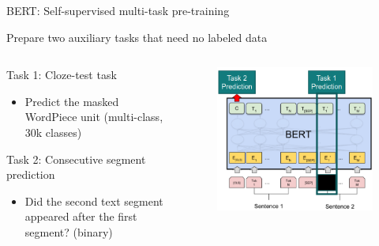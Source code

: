 \documentclass[12pt,aspectratio=169,handout]{beamer}
\begin{document}
\begin{frame}{BERT: Self-supervised multi-task pre-training}
	
	Prepare two auxiliary tasks that need no labeled data
	
	\bigskip
	
	\begin{columns}
		\begin{column}{0.5\linewidth}
			\begin{small}
				Task 1: Cloze-test task
				\begin{itemize}
					\item 	Predict the masked WordPiece unit (multi-class, 30k classes)
				\end{itemize}
				
				
				Task 2: Consecutive segment prediction
				
				\begin{itemize}
					\item Did the second text segment appeared after the first segment? (binary)
				\end{itemize}
			\end{small}
			
		\end{column}
		\begin{column}{0.5\linewidth}
			
			\begin{figure}
				\includegraphics[width=\linewidth]{img/bert-pretraining.png}
			\end{figure}
		\end{column}
		
	\end{columns}
\end{frame}
\end{document}
